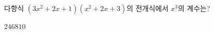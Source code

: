 다항식 $(3x^2+2x+1)(x^2+2x+3)$의 전개식에서 $x^3$의 계수는?
\begin{choices32}{$2$}{$4$}{$6$}{$8$}{$10$}\end{choices32}
